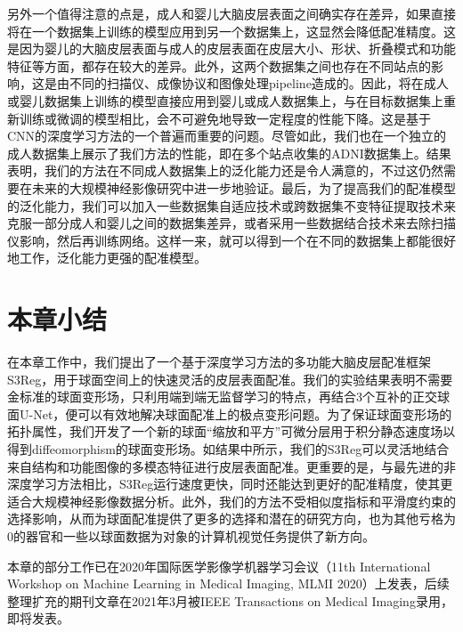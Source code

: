 另外一个值得注意的点是，成人和婴儿大脑皮层表面之间确实存在差异，如果直接将在一个数据集上训练的模型应用到另一个数据集上，这显然会降低配准精度。这是因为婴儿的大脑皮层表面与成人的皮层表面在皮层大小、形状、折叠模式和功能特征等方面，都存在较大的差异\cite{li2015construction}。此外，这两个数据集之间也存在不同站点的影响，这是由不同的扫描仪、成像协议和图像处理pipeline造成的。因此，将在成人或婴儿数据集上训练的模型直接应用到婴儿或成人数据集上，与在目标数据集上重新训练或微调的模型相比，会不可避免地导致一定程度的性能下降。这是基于CNN的深度学习方法的一个普遍而重要的问题\cite{shen2017deep}。尽管如此，我们也在一个独立的成人数据集上展示了我们方法的性能，即在多个站点收集的ADNI数据集上。结果表明，我们的方法在不同成人数据集上的泛化能力还是令人满意的，不过这仍然需要在未来的大规模神经影像研究中进一步地验证。最后，为了提高我们的配准模型的泛化能力，我们可以加入一些数据集自适应技术\cite{he2020self}或跨数据集不变特征提取技术\cite{zhong2020dika}来克服一部分成人和婴儿之间的数据集差异，或者采用一些数据结合技术\cite{zhao2019harmonization}来去除扫描仪影响，然后再训练网络。这样一来，就可以得到一个在不同的数据集上都能很好地工作，泛化能力更强的配准模型。

\section{本章小结}
在本章工作中，我们提出了一个基于深度学习方法的多功能大脑皮层配准框架S3Reg，用于球面空间上的快速灵活的皮层表面配准。我们的实验结果表明不需要金标准的球面变形场，只利用端到端无监督学习的特点，再结合3个互补的正交球面U-Net，便可以有效地解决球面配准上的极点变形问题。为了保证球面变形场的拓扑属性，我们开发了一个新的球面“缩放和平方”可微分层用于积分静态速度场以得到diffeomorphism的球面变形场。如结果中所示，我们的S3Reg可以灵活地结合来自结构和功能图像的多模态特征进行皮层表面配准。更重要的是，与最先进的非深度学习方法相比，S3Reg运行速度更快，同时还能达到更好的配准精度，使其更适合大规模神经影像数据分析。此外，我们的方法不受相似度指标和平滑度约束的选择影响，从而为球面配准提供了更多的选择和潜在的研究方向，也为其他亏格为0的器官和一些以球面数据为对象的计算机视觉任务提供了新方向。

本章的部分工作已在2020年国际医学影像学机器学习会议（11th International Workshop on Machine Learning in Medical Imaging, MLMI 2020）上发表，后续整理扩充的期刊文章在2021年3月被IEEE Transactions on Medical Imaging录用，即将发表。










